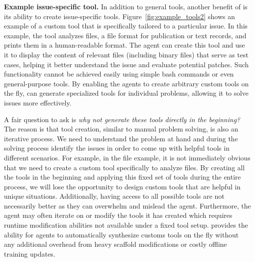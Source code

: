 \textbf{Example issue-specific tool.}
In addition to general tools, another benefit of \tech is its ability to create issue-specific tools.
Figure~\ref{fig:example_tools2} shows an example of a custom tool that is specifically tailored to a particular issue.
In this example, the tool analyzes  files, a file format for publication or text records, and prints them in a human-readable format. 
The agent can create this tool and use it to display the content of relevant  files (including binary files) that serve as test cases, helping it better understand the issue and evaluate potential patches.
Such functionality cannot be achieved easily using simple bash commands or even general-purpose tools.
By enabling the agents to create arbitrary custom tools on the fly, \tech can generate specialized tools for individual problems, allowing it to solve issues more effectively.



A fair question to ask is \textit{why not generate these tools directly in the beginning?} 
The reason is that tool creation, similar to manual problem solving, is also an iterative process.
We need to understand the problem at hand and during the solving process identify the issues in order to come up with helpful tools in different scenarios.
For example, in the  file example, it is not immediately obvious that we need to create a custom tool specifically to analyze  files.
By creating all the tools in the beginning and applying this fixed set of tools during the entire process, we will lose the opportunity to design custom tools that are helpful in unique situations.
Additionally, having access to all possible tools are not necessarily better as they can overwhelm and mislead the agent.
Furthermore, the agent may often iterate on or modify the tools it has created which requires runtime modification abilities not available under a fixed tool setup. 
\tech provides the ability for agents to automatically synthesize customs tools on the fly without any additional overhead from heavy scaffold modifications or costly offline training updates.
